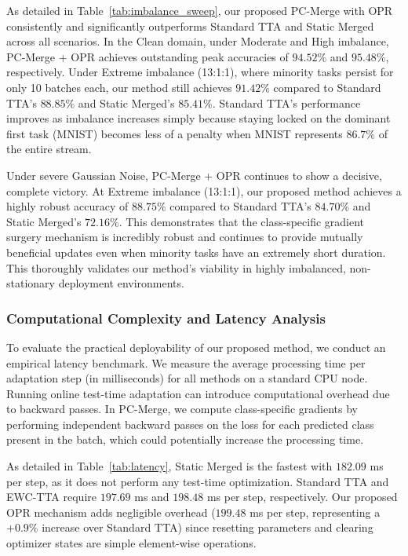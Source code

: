 \documentclass{article}
\theoremstyle{plain}
\theoremstyle{definition}
\theoremstyle{remark}
\begin{document}
As detailed in Table~\ref{tab:imbalance_sweep}, our proposed PC-Merge with OPR consistently and significantly outperforms Standard TTA and Static Merged across all scenarios. In the Clean domain, under Moderate and High imbalance, PC-Merge + OPR achieves outstanding peak accuracies of $\mathbf{94.52\%}$ and $\mathbf{95.48\%}$, respectively. Under Extreme imbalance (13:1:1), where minority tasks persist for only 10 batches each, our method still achieves $\mathbf{91.42\%}$ compared to Standard TTA's $88.85\%$ and Static Merged's $85.41\%$. Standard TTA's performance improves as imbalance increases simply because staying locked on the dominant first task (MNIST) becomes less of a penalty when MNIST represents $86.7\%$ of the entire stream.

Under severe Gaussian Noise, PC-Merge + OPR continues to show a decisive, complete victory. At Extreme imbalance (13:1:1), our proposed method achieves a highly robust accuracy of $\mathbf{88.75\%}$ compared to Standard TTA's $84.70\%$ and Static Merged's $72.16\%$. This demonstrates that the class-specific gradient surgery mechanism is incredibly robust and continues to provide mutually beneficial updates even when minority tasks have an extremely short duration. This thoroughly validates our method's viability in highly imbalanced, non-stationary deployment environments.

\subsubsection{Computational Complexity and Latency Analysis}
To evaluate the practical deployability of our proposed method, we conduct an empirical latency benchmark. We measure the average processing time per adaptation step (in milliseconds) for all methods on a standard CPU node. Running online test-time adaptation can introduce computational overhead due to backward passes. In PC-Merge, we compute class-specific gradients by performing independent backward passes on the loss for each predicted class present in the batch, which could potentially increase the processing time.

As detailed in Table~\ref{tab:latency}, Static Merged is the fastest with $182.09$ ms per step, as it does not perform any test-time optimization. Standard TTA and EWC-TTA require $197.69$ ms and $198.48$ ms per step, respectively. Our proposed OPR mechanism adds negligible overhead ($199.48$ ms per step, representing a $+0.9\%$ increase over Standard TTA) since resetting parameters and clearing optimizer states are simple element-wise operations.
\end{document}
